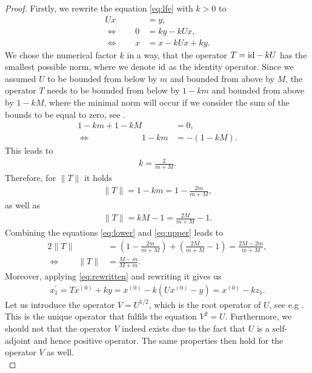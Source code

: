 \begin{proof}
Firstly, we rewrite the equation \eqref{eq:lfe} with $k>0$ to
\begin{align}\label{eq:rewritten}
Ux &= y,\nonumber\\
\Longleftrightarrow \qquad 0 &= ky - kUx,\nonumber\\
\Longleftrightarrow \qquad x &= x - kUx + ky.
\end{align}
We chose the numerical factor $k$ in a way, that the operator $T=\mathrm{id}-kU$ has the smallest possible norm, where we denote $\mathrm{id}$ as the identity operator. Since we assumed $U$ to be bounded from below by $m$ and bounded from above by $M$, the operator $T$ needs to be bounded from below by $1-km$ and bounded from above by $1-kM$, where the minimal norm will occur if we consider the sum of the bounds to be equal to zero, see \cite[Chapter~XV Theorem~2]{kantorovich2016functional}.
\begin{align*}
1-km + 1-kM &= 0,\\
\Longleftrightarrow \qquad\qquad\qquad 1-km &= -(1-kM).
\end{align*}
This leads to
\begin{align*}
k = \frac{2}{m + M}.
\end{align*}
Therefore, for $\|T\|$ it holds
\begin{align}\label{eq:lower}
\|T\| = 1 - km = 1 - \frac{2m}{m+M},
\end{align}
as well as
\begin{align}\label{eq:upper}
\|T\| = kM - 1 = \frac{2M}{m+M} - 1.
\end{align}
Combining the equations \eqref{eq:lower} and \eqref{eq:upper} leads to
\begin{align*}
2\|T\| &= \left( 1 - \frac{2m}{m+M}\right) + \left( \frac{2M}{m+M} - 1\right) = \frac{2M - 2m}{m+M},\\
\Longleftrightarrow \qquad \|T\| &= \frac{M-m}{M+m}.
\end{align*}
Moreover, applying \eqref{eq:rewritten} and rewriting it gives us
\begin{align}\label{eq:x_prime}
x^{\prime}_1 = Tx^{(0)} + ky = x^{(0)} - k(Ux^{(0)} - y) = x^{(0)} - kz_1.
\end{align}
Let us introduce the operator $V = U^{1/2}$, which is the root operator of $U$, see e.g \cite[Theorem~V.6.2]{kantorovich2016functional}. This is the unique operator that fulfils the equation $V^2 = U$. Furthermore, we should not that the operator $V$ indeed exists due to the fact that $U$ is a self-adjoint and hence positive operator. The same properties then hold for the operator $V$ as well.\\

\end{proof}
